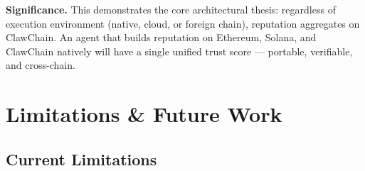 \documentclass[conference]{IEEEtran}
\begin{document}
\textbf{Significance.} This demonstrates the core architectural thesis: regardless of execution environment (native, cloud, or foreign chain), reputation aggregates on ClawChain. An agent that builds reputation on Ethereum, Solana, and ClawChain natively will have a single unified trust score — portable, verifiable, and cross-chain.

\section{Limitations \& Future Work}\label{sec:limitations}

\subsection{Current Limitations}
\end{document}
